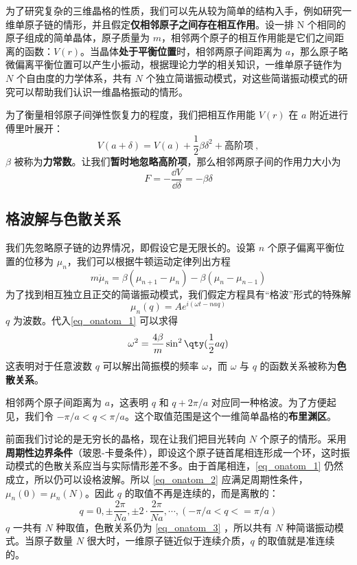 

为了研究复杂的三维晶格的性质，我们可以先从较为简单的结构入手，例如研究一维单原子链的情形，并且假定\textbf{仅相邻原子之间存在相互作用}。设一排 N 个相同的原子组成的简单晶体，原子质量为 $m$，相邻两个原子的相互作用能是它们之间距离的函数：$V(r)$。当晶体\textbf{处于平衡位置}时，相邻两原子间距离为 $a$，那么原子略微偏离平衡位置可以产生小振动，根据理论力学的相关知识，一维单原子链作为 $N$ 个自由度的力学体系，共有 $N$ 个独立简谐振动模式，对这些简谐振动模式的研究可以帮助我们认识一维晶格振动的情形。

为了衡量相邻原子间弹性恢复力的程度，我们把相互作用能 $V(r)$ 在 $a$ 附近进行傅里叶展开：
\begin{equation}
V(a+\delta)=V(a)+\frac{1}{2}\beta \delta^2+\text{高阶项}~,
\end{equation}
$\beta$ 被称为\textbf{力常数}。让我们\textbf{暂时地忽略高阶项}，那么相邻两原子间的作用力大小为
\begin{equation}
F=-\frac{\dd V}{\dd \delta}=-\beta\delta
\end{equation}

\subsection{格波解与色散关系}
我们先忽略原子链的边界情况，即假设它是无限长的。设第 $n$ 个原子偏离平衡位置的位移为 $\mu_n$，我们可以根据牛顿运动定律列出方程
\begin{equation}\label{eq_onatom_1}
m \ddot \mu_n = \beta(\mu_{n+1}-\mu_n)-\beta(\mu_n - \mu_{n-1})
\end{equation}
为了找到相互独立且正交的简谐振动模式，我们假定方程具有“格波”形式的特殊解
\begin{equation}\label{eq_onatom_2}
\mu_{n}(q)=Ae^{i(\omega t-naq)}
\end{equation}
$q$ 为波数。代入\autoref{eq_onatom_1} 可以求得
\begin{equation}\label{eq_onatom_3}
\omega^2=\frac{4\beta}{m}\sin^2 \qty(\frac{1}{2}aq)
\end{equation}
这表明对于任意波数 $q$ 可以解出简振模的频率 $\omega$，而 $\omega$ 与 $q$ 的函数关系被称为\textbf{色散关系}。

相邻两个原子间距离为 $a$，这表明 $q$ 和 $q+2\pi/a$ 对应同一种格波。为了方便起见，我们令 $-\pi/a<q<\pi/a$。这个取值范围是这个一维简单晶格的\textbf{布里渊区}。

前面我们讨论的是无穷长的晶格，现在让我们把目光转向 $N$ 个原子的情形。采用\textbf{周期性边界条件}（玻恩-卡曼条件），即设这个原子链首尾相连形成一个环，这时振动模式的色散关系应当与实际情形差不多。由于首尾相连，\autoref{eq_onatom_1} 仍然成立，所以仍可以设格波解。所以 \autoref{eq_onatom_2} 应满足周期性条件，$\mu_n(0)=\mu_n(N)$。因此 $q$ 的取值不再是连续的，而是离散的：
\begin{equation}
q=0,\pm \frac{2\pi}{Na},\pm 2\cdot \frac{2\pi}{Na},\cdots, (-\pi/a<q<=\pi/a)
\end{equation}
$q$ 一共有 $N$ 种取值，色散关系仍为 \autoref{eq_onatom_3} ，所以共有 $N$ 种简谐振动模式。当原子数量 $N$ 很大时，一维原子链近似于连续介质，$q$ 的取值就是准连续的。
